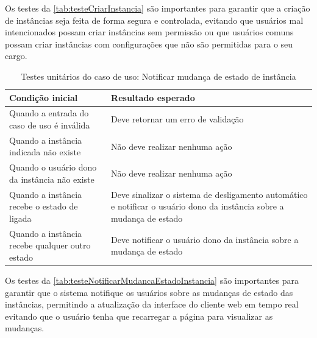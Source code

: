 Os testes da \autoref{tab:testeCriarInstancia} são importantes para garantir que a criação de instâncias seja feita de forma segura e controlada, evitando que usuários mal intencionados possam criar instâncias sem permissão ou que usuários comuns possam criar instâncias com configurações que não são permitidas para o seu cargo.

\begin{table}[h]
\caption{Testes unitários do caso de uso: Notificar mudança de estado de instância}
\label{tab:testeNotificarMudancaEstadoInstancia}
\begin{tabularx}{\textwidth}{p{} p{}}
\toprule
\textbf{Condição inicial} & \textbf{Resultado esperado} \\ \midrule

Quando a entrada do caso de uso é inválida & Deve retornar um erro de validação \\ \hline

Quando a instância indicada não existe & Não deve realizar nenhuma ação \\ \hline

Quando o usuário dono da instância não existe & Não deve realizar nenhuma ação \\ \hline

Quando a instância recebe o estado de ligada & Deve sinalizar o sistema de desligamento automático e notificar o usuário dono da instância sobre a mudança de estado \\ \hline

Quando a instância recebe qualquer outro estado & Deve notificar o usuário dono da instância sobre a mudança de estado \\

\bottomrule
\end{tabularx}
\end{table}

Os testes da \autoref{tab:testeNotificarMudancaEstadoInstancia} são importantes para garantir que o sistema notifique os usuários sobre as mudanças de estado das instâncias, permitindo a atualização da interface do cliente web em tempo real evitando que o usuário tenha que recarregar a página para visualizar as mudanças.

